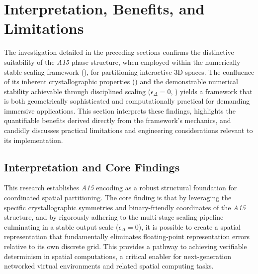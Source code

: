 \documentclass[10pt]{article}
\def\AAAB{\textit{A15}}
\begin{document}
\section{Interpretation, Benefits, and Limitations}\label{sec-discussion}

The investigation detailed in the preceding sections confirms the distinctive suitability of the \AAAB{} phase structure, when employed within the numerically stable scaling framework (), for partitioning interactive 3D spaces. The confluence of its inherent crystallographic properties () and the demonstrable numerical stability achievable through disciplined scaling ($\epsilon_\Delta = 0$, ) yields a framework that is both geometrically sophisticated and computationally practical for demanding immersive applications. This section interprets these findings, highlights the quantifiable benefits derived directly from the framework's mechanics, and candidly discusses practical limitations and engineering considerations relevant to its implementation.

\subsection{Interpretation and Core Findings}\label{subsec-discussion-interpretation}

This research establishes \AAAB{} encoding as a robust structural foundation for coordinated spatial partitioning. The core finding is that by leveraging the specific crystallographic symmetries and binary-friendly coordinates of the \AAAB{} structure, and by rigorously adhering to the multi-stage scaling pipeline culminating in a stable output scale ($\epsilon_\Delta = 0$), it is possible to create a spatial representation that fundamentally eliminates floating-point representation errors relative to its own discrete grid. This provides a pathway to achieving verifiable determinism in spatial computations, a critical enabler for next-generation networked virtual environments and related spatial computing tasks.
\end{document}
